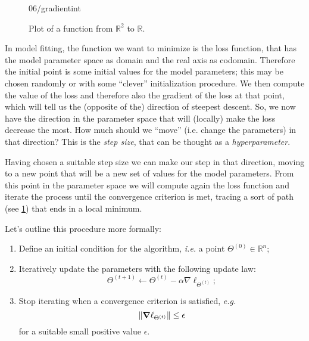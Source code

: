 \begin{figure}[H]
	\centering
	\begin{overpic}
	[trim=0cm 0cm 0cm 0cm,clip,width=0.5\linewidth]{06/gradientint}
	\end{overpic}
    \caption{Plot of a function from $\mathbb{R}^2$ to $\mathbb{R}$.}
    \label{fig:06:1:gradient}
\end{figure}

In model fitting, the function we want to minimize is the loss function, that has the model parameter space as domain and the real axis as codomain. Therefore the initial point is some initial values for the model parameters; this may be chosen randomly or with some ``clever'' initialization procedure. We then compute the value of the loss and therefore also the gradient of the loss at that point, which will tell us the (opposite of the) direction of steepest descent. So, we now have the direction in the parameter space that will (locally) make the loss decrease the most. How much should we ``move'' (i.e. change the parameters) in that direction? This is the \emph{step size}, that can be thought as a \emph{hyperparameter}. 

Having chosen a suitable step size we can make our step in that direction, moving to a new point that will be a new set of values for the model parameters. From this point in the parameter space we will compute again the loss function and iterate the process until the convergence criterion is met, tracing a sort of path (see \cref{fig:06:1:gradient}) that ends in a local minimum.

Let's outline this procedure more formally:
\begin{enumerate}
	\item Define an initial condition for the algorithm, \textit{i.e.} a point $\Theta^{(0)} \in \mathbb{R}^n$;
	\item Iteratively update the parameters with the following update law:
			\begin{equation}
				\Theta^{(t+1)} \gets \Theta^{(t)} - \alpha\nabla\ell_{\Theta^{(t)}};
				\label{eq:chap6:intro:update-law}
			\end{equation}
	\item Stop iterating when a convergence criterion is satisfied, \textit{e.g.}
	\[
		\norm{\gradient \ell_{\Theta^{(t)}}} \leq \epsilon
	\]
	for a suitable small positive value $\epsilon$.
\end{enumerate}